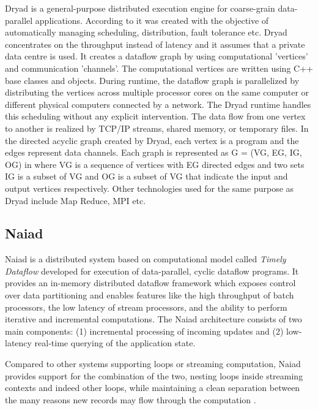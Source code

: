     Dryad is a general-purpose distributed execution engine for
    coarse-grain data-parallel applications. According to
    \cite{www-DryadIntro} it was created with the objective of
    automatically managing scheduling, distribution, fault tolerance
    etc. Dryad concentrates on the throughput instead of latency and
    it assumes that a private data centre is used. It creates a
    dataflow graph by using computational 'vertices' and communication
    'channels'. The computational vertices are written using C++ base
    classes and objects. During runtime, the dataflow graph is
    parallelized by distributing the vertices across multiple
    processor cores on the same computer or different physical
    computers connected by a network. The Dryad runtime handles this
    scheduling without any explicit intervention. The data flow from
    one vertex to another is realized by TCP/IP streams, shared
    memory, or temporary files. In the directed acyclic graph created
    by Dryad, each vertex is a program and the edges represent data
    channels. Each graph is represented as G = (VG, EG, IG, OG) in
    \cite{DryadPaper} where VG is a sequence of vertices with EG
    directed edges and two sets IG is a subset of VG and OG is a
    subset of VG that indicate the input and output vertices
    respectively. Other technologies used for the same purpose as
    Dryad include Map Reduce, MPI etc.

    \pv

    
\subsection{Naiad}

    Naiad \cite{paper-naiad} is a distributed system based on
    computational model called \textit{Timely Dataflow} developed for
    execution of data-parallel, cyclic dataflow programs. It provides
    an in-memory distributed dataflow framework which exposes control
    over data partitioning and enables features like the high
    throughput of batch processors, the low latency of stream
    processors, and the ability to perform iterative and incremental
    computations. The Naiad architecture consists of two main
    components: (1) incremental processing of incoming updates and (2)
    low-latency real-time querying of the application state.
    
    Compared to other systems supporting loops or streaming
    computation, Naiad provides support for the combination of the
    two, nesting loops inside streaming contexts and indeed other
    loops, while maintaining a clean separation between the many
    reasons new records may flow through the computation
    \cite{www-naiad}.
    
